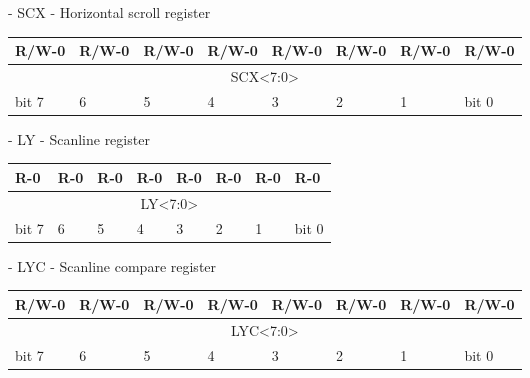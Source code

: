 \documentclass[\main/gbctr.tex]{subfiles}
\begin{document}
\begin{register}[H]
  \caption{ - SCX - Horizontal scroll register}
  {
    \ttfamily
    \begin{tabularx}{\linewidth}{|X|X|X|X|X|X|X|X|}
      \hline
      R/W-0                           & R/W-0 & R/W-0 & R/W-0 & R/W-0 & R/W-0 & R/W-0 & R/W-0 \\
      \hline
      \multicolumn{8}{|c|}{SCX<7:0>} \\
      \hline
      bit 7                           & 6     & 5     & 4     & 3     & 2     & 1     & bit 0 \\
      \hline
    \end{tabularx}{\parfillskip=0pt\par}
  }
\end{register}

\begin{register}[H]
  \caption{ - LY - Scanline register}
  {
    \ttfamily
    \begin{tabularx}{\linewidth}{|X|X|X|X|X|X|X|X|}
      \hline
      R-0                            & R-0 & R-0 & R-0 & R-0 & R-0 & R-0 & R-0   \\
      \hline
      \multicolumn{8}{|c|}{LY<7:0>} \\
      \hline
      bit 7                          & 6   & 5   & 4   & 3   & 2   & 1   & bit 0 \\
      \hline
    \end{tabularx}{\parfillskip=0pt\par}
  }
\end{register}

\begin{register}[H]
  \caption{ - LYC - Scanline compare register}
  {
    \ttfamily
    \begin{tabularx}{\linewidth}{|X|X|X|X|X|X|X|X|}
      \hline
      R/W-0                           & R/W-0 & R/W-0 & R/W-0 & R/W-0 & R/W-0 & R/W-0 & R/W-0 \\
      \hline
      \multicolumn{8}{|c|}{LYC<7:0>} \\
      \hline
      bit 7                           & 6     & 5     & 4     & 3     & 2     & 1     & bit 0 \\
      \hline
    \end{tabularx}{\parfillskip=0pt\par}
  }
\end{register}
\end{document}
